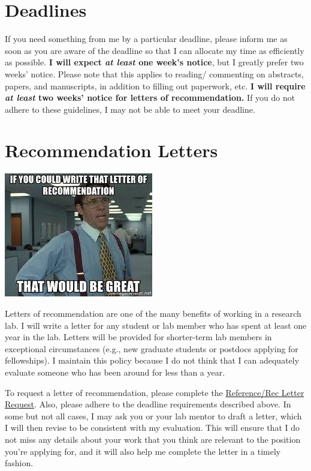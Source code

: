 \documentclass[
]{book}
\begin{document}
\hypertarget{deadlines}{%
\section{Deadlines}\label{deadlines}}

If you need something from me by a particular deadline, please inform me as soon as you are aware of the deadline so that I can allocate my time as efficiently as possible. \textbf{I will expect \emph{at least} one week's notice}, but I greatly prefer two weeks' notice. Please note that this applies to reading/ commenting on abstracts, papers, and manuscripts, in addition to filling out paperwork, etc. \textbf{I will require \emph{at least} two weeks' notice for letters of recommendation.} If you do not adhere to these guidelines, I may not be able to meet your deadline.

\hypertarget{recommendation-letters}{%
\section{Recommendation Letters}\label{recommendation-letters}}

\includegraphics{images/recletter.jpg}

Letters of recommendation are one of the many benefits of working in a research lab. I will write a letter for any student or lab member who has spent at least one year in the lab. Letters will be provided for shorter-term lab members in exceptional circumstances (e.g., new graduate students or postdocs applying for fellowships). I maintain this policy because I do not think that I can adequately evaluate someone who has been around for less than a year.

To request a letter of recommendation, please complete the \href{https://docs.google.com/forms/d/1F_NeLFXH7F3mjJD0l_cS1RFaUSOPS_IdfeT4KvJvLgU/edit}{Reference/Rec Letter Request}. Also, please adhere to the deadline requirements described above. In some but not all cases, I may ask you or your lab mentor to draft a letter, which I will then revise to be consistent with my evaluation. This will ensure that I do not miss any details about your work that you think are relevant to the position you're applying for, and it will also help me complete the letter in a timely fashion.
\end{document}
